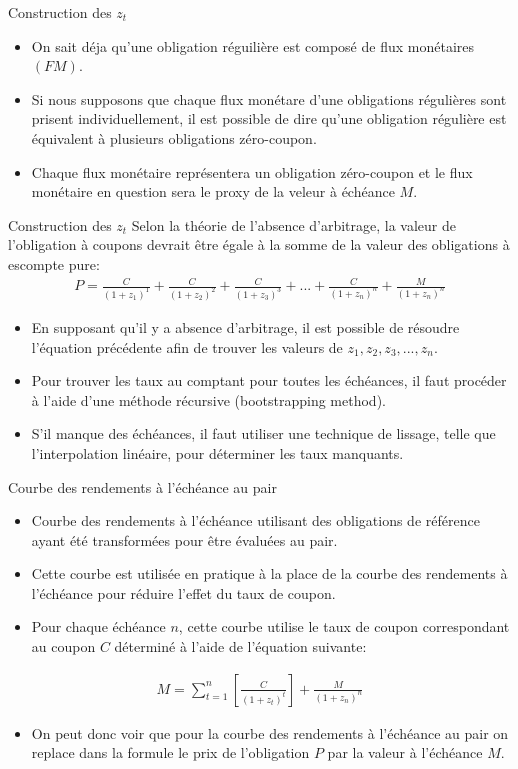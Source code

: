 \documentclass{beamer}
\begin{document}
\begin{frame}{Construction des $z_t$}
\begin{itemize}
\item On sait déja qu'une obligation réguilière est composé de flux monétaires $(FM)$. 
\item Si nous supposons que chaque flux monétare d'une obligations régulières sont prisent individuellement,  il est possible de dire qu'une obligation régulière est équivalent à plusieurs obligations zéro-coupon. 
\item Chaque flux monétaire représentera un obligation zéro-coupon et le flux monétaire en question sera le proxy de la veleur à échéance $M$.
\end{itemize}
\end{frame}

\begin{frame}{Construction des $z_t$}
Selon la théorie de l’absence d’arbitrage, la valeur de l’obligation à coupons devrait être égale à la somme de la valeur des obligations à escompte pure:
\begin{align*}
P=\frac{C}{(1+z_1)^1}+\frac{C}{(1+z_2)^2}+\frac{C}{(1+z_3)^3}+...+\frac{C}{(1+z_n)^n}+\frac{M}{(1+z_n)^{n}}
\end{align*}
\begin{itemize}
\item En supposant qu’il y a absence d’arbitrage,  il est possible de résoudre l’équation précédente afin de trouver les valeurs de $z_1, z_2, z_3,...,z_n$.  
\item Pour trouver les taux au comptant pour toutes les échéances,  il faut procéder à l’aide d’une méthode récursive (bootstrapping method). 
\item S’il manque des échéances, il faut utiliser une technique de lissage, telle que l’interpolation linéaire, pour déterminer les taux manquants.
\end{itemize}
\end{frame}
\begin{frame}{Courbe des rendements à l’échéance au pair}
\begin{itemize}
\item Courbe des rendements à l’échéance utilisant des obligations de référence ayant été transformées pour être évaluées au pair.  
\item Cette courbe est utilisée en pratique à la place de la courbe des rendements à l’échéance pour réduire l’effet du taux de coupon.
\item Pour chaque échéance $n$,  cette courbe utilise le taux de coupon correspondant au coupon $C$ déterminé à l’aide de l’équation suivante:
\end{itemize}
\begin{align*}
M=\sum_{t=1}^n \left[ \frac{C}{(1+z_t)^t} \right]+\frac{M}{(1+z_n)^{n}}
\end{align*}
\begin{itemize}
\item On peut donc voir que pour la courbe des rendements à l’échéance au pair on replace dans la formule le prix de l'obligation $P$ par la valeur à l'échéance $M$.
\end{itemize}
\end{frame}
\end{document}
